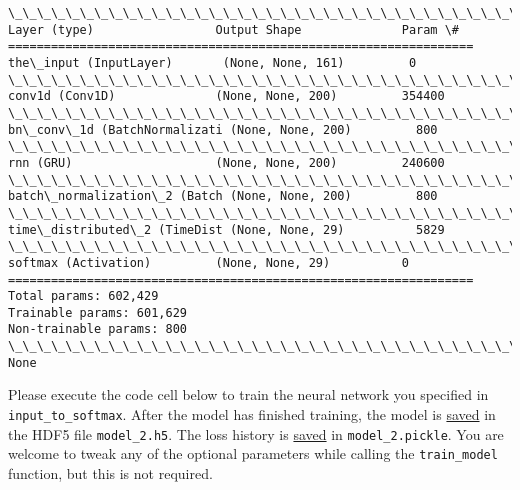 \documentclass[11pt]{article}
\begin{document}
    \begin{Verbatim}[commandchars=\\\{\}]
\_\_\_\_\_\_\_\_\_\_\_\_\_\_\_\_\_\_\_\_\_\_\_\_\_\_\_\_\_\_\_\_\_\_\_\_\_\_\_\_\_\_\_\_\_\_\_\_\_\_\_\_\_\_\_\_\_\_\_\_\_\_\_\_\_
Layer (type)                 Output Shape              Param \#   
=================================================================
the\_input (InputLayer)       (None, None, 161)         0         
\_\_\_\_\_\_\_\_\_\_\_\_\_\_\_\_\_\_\_\_\_\_\_\_\_\_\_\_\_\_\_\_\_\_\_\_\_\_\_\_\_\_\_\_\_\_\_\_\_\_\_\_\_\_\_\_\_\_\_\_\_\_\_\_\_
conv1d (Conv1D)              (None, None, 200)         354400    
\_\_\_\_\_\_\_\_\_\_\_\_\_\_\_\_\_\_\_\_\_\_\_\_\_\_\_\_\_\_\_\_\_\_\_\_\_\_\_\_\_\_\_\_\_\_\_\_\_\_\_\_\_\_\_\_\_\_\_\_\_\_\_\_\_
bn\_conv\_1d (BatchNormalizati (None, None, 200)         800       
\_\_\_\_\_\_\_\_\_\_\_\_\_\_\_\_\_\_\_\_\_\_\_\_\_\_\_\_\_\_\_\_\_\_\_\_\_\_\_\_\_\_\_\_\_\_\_\_\_\_\_\_\_\_\_\_\_\_\_\_\_\_\_\_\_
rnn (GRU)                    (None, None, 200)         240600    
\_\_\_\_\_\_\_\_\_\_\_\_\_\_\_\_\_\_\_\_\_\_\_\_\_\_\_\_\_\_\_\_\_\_\_\_\_\_\_\_\_\_\_\_\_\_\_\_\_\_\_\_\_\_\_\_\_\_\_\_\_\_\_\_\_
batch\_normalization\_2 (Batch (None, None, 200)         800       
\_\_\_\_\_\_\_\_\_\_\_\_\_\_\_\_\_\_\_\_\_\_\_\_\_\_\_\_\_\_\_\_\_\_\_\_\_\_\_\_\_\_\_\_\_\_\_\_\_\_\_\_\_\_\_\_\_\_\_\_\_\_\_\_\_
time\_distributed\_2 (TimeDist (None, None, 29)          5829      
\_\_\_\_\_\_\_\_\_\_\_\_\_\_\_\_\_\_\_\_\_\_\_\_\_\_\_\_\_\_\_\_\_\_\_\_\_\_\_\_\_\_\_\_\_\_\_\_\_\_\_\_\_\_\_\_\_\_\_\_\_\_\_\_\_
softmax (Activation)         (None, None, 29)          0         
=================================================================
Total params: 602,429
Trainable params: 601,629
Non-trainable params: 800
\_\_\_\_\_\_\_\_\_\_\_\_\_\_\_\_\_\_\_\_\_\_\_\_\_\_\_\_\_\_\_\_\_\_\_\_\_\_\_\_\_\_\_\_\_\_\_\_\_\_\_\_\_\_\_\_\_\_\_\_\_\_\_\_\_
None

    \end{Verbatim}

    Please execute the code cell below to train the neural network you
specified in \texttt{input\_to\_softmax}. After the model has finished
training, the model is
\href{https://keras.io/getting-started/faq/\#how-can-i-save-a-keras-model}{saved}
in the HDF5 file \texttt{model\_2.h5}. The loss history is
\href{https://wiki.python.org/moin/UsingPickle}{saved} in
\texttt{model\_2.pickle}. You are welcome to tweak any of the optional
parameters while calling the \texttt{train\_model} function, but this is
not required.
\end{document}
